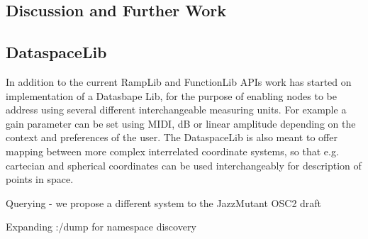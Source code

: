 \documentclass{NIME-alternate}
\begin{document}
\begin{Abstract}

\section{Discussion and Further Work} %
\label{sec:discussion_and_further_work}   

%

%
%
%



\subsection{DataspaceLib} %
\label{sub:dataspacelib}

In addition  to the current RampLib and FunctionLib APIs work has started on implementation of a Datasbape Lib, for the purpose of enabling nodes to be address using several different interchangeable measuring units. For example a gain parameter can be set using MIDI, dB or linear amplitude depending on the context and preferences of the user. The DataspaceLib is also meant to offer mapping between more complex interrelated coordinate systems, so that e.g. cartecian and spherical coordinates can be used interchangeably for description of points in space.






Querying - we propose a different system to the JazzMutant OSC2 draft

Expanding :/dump for namespace discovery


\end{Abstract}
\end{document}
